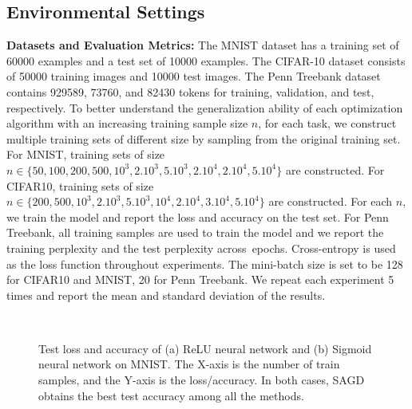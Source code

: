 \documentclass[11pt]{article}
\begin{document}
\vspace{-0.05in}
\subsection{Environmental Settings}
\vspace{-0.05in}

\textbf{Datasets and Evaluation Metrics:}  The MNIST dataset has a training set of 60000 examples and a test set of 10000 examples. The CIFAR-10 dataset consists of 50000 
training images and 10000 test images. The Penn Treebank dataset contains 929589, 73760, and 82430 tokens for training, validation, and test,  respectively.
To better understand the generalization ability of each optimization algorithm with an increasing training sample size $n$, for each task, we construct multiple training sets of different size by sampling from the original training set. For MNIST, training sets of size $n \in \{50, 100, 200, 500, 10^3, 2.10^3, 5.10^3, 2.10^4, 2.10^4, 5.10^4 \}$ are constructed. For CIFAR10, training sets of size $n \in \{ 200, 500, 10^3, 2.10^3, 5.10^3, 10^4, 2.10^4,3.10^4, 5.10^4\}$ are constructed. 
For each $n$, we train the model and report the loss and accuracy on the test set.  
For Penn Treebank, all training samples are used to train the model and we report the training perplexity and the test perplexity across~epochs. 
Cross-entropy is used as the loss function throughout experiments. The mini-batch size is set to be 128 for CIFAR10 and MNIST, 20 for Penn Treebank. 
We repeat each experiment 5 times and report the mean and standard deviation of the results.
\begin{figure}[t]
\mbox{
\hspace{-0.2in}
 }
 \vspace{-0.1in}
 \caption[]{Test loss and accuracy of (a) ReLU neural network and (b) Sigmoid neural network on MNIST. The X-axis is the number of train samples, and the Y-axis is the loss/accuracy. In both cases, \textsc{SAGD} obtains the best test accuracy among all the methods.} 
 \label{fig:mnist}\vspace{-0.15in}
\end{figure}
\end{document}
